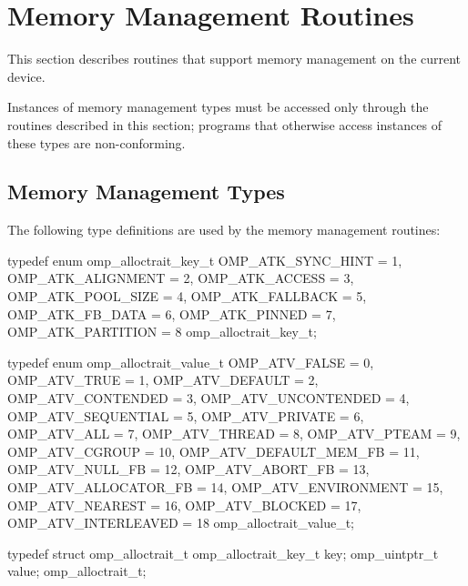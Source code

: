 \section{Memory Management Routines}
\label{sec:Memory Management Routines}
This section describes routines that support memory management on the current device.

Instances of memory management types must be accessed only through 
the routines described in this section; programs that otherwise 
access instances of these types are non-conforming.



\subsection{Memory Management Types}
\label{subsec:Memory Management Types}

The following type definitions are used by the memory management routines:

\begin{ccppspecific}
\begin{ompEnv}
typedef enum omp_alloctrait_key_t {
  OMP_ATK_SYNC_HINT = 1,
  OMP_ATK_ALIGNMENT = 2,
  OMP_ATK_ACCESS = 3,
  OMP_ATK_POOL_SIZE = 4,
  OMP_ATK_FALLBACK = 5,
  OMP_ATK_FB_DATA = 6,
  OMP_ATK_PINNED = 7,
  OMP_ATK_PARTITION = 8
} omp_alloctrait_key_t;

typedef enum omp_alloctrait_value_t {
  OMP_ATV_FALSE = 0,
  OMP_ATV_TRUE = 1,
  OMP_ATV_DEFAULT = 2,
  OMP_ATV_CONTENDED = 3,
  OMP_ATV_UNCONTENDED = 4,
  OMP_ATV_SEQUENTIAL = 5,
  OMP_ATV_PRIVATE = 6,
  OMP_ATV_ALL = 7,
  OMP_ATV_THREAD = 8,
  OMP_ATV_PTEAM = 9,
  OMP_ATV_CGROUP = 10,
  OMP_ATV_DEFAULT_MEM_FB = 11,
  OMP_ATV_NULL_FB = 12,
  OMP_ATV_ABORT_FB = 13,
  OMP_ATV_ALLOCATOR_FB = 14,
  OMP_ATV_ENVIRONMENT = 15,
  OMP_ATV_NEAREST = 16,
  OMP_ATV_BLOCKED = 17,
  OMP_ATV_INTERLEAVED = 18
} omp_alloctrait_value_t;

typedef struct omp_alloctrait_t {
  omp_alloctrait_key_t key;
  omp_uintptr_t value;
} omp_alloctrait_t;

\end{ompEnv}
\end{ccppspecific}

